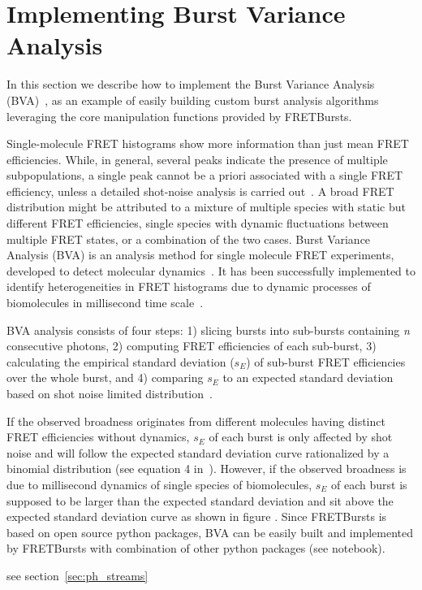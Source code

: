 \section{Implementing Burst Variance Analysis}
In this section we describe how to implement the Burst Variance Analysis (BVA)~\cite{Torella_2011},
as an example of easily building custom burst analysis algorithms leveraging the core manipulation 
functions provided by FRETBursts.

Single-molecule FRET histograms show more information than just mean FRET efficiencies. 
While, in general, several peaks indicate the presence of multiple subpopulations, 
a single peak cannot be a priori associated with a single FRET efficiency,
unless a detailed shot-noise analysis is carried out~\cite{Nir_2006}.
A broad FRET distribution might be attributed to a mixture of multiple species with static but different FRET efficiencies, single species with dynamic fluctuations between multiple FRET states, or a combination of the two cases. Burst Variance Analysis (BVA) is an analysis method for single molecule FRET experiments, developed to detect molecular dynamics~\cite{Torella_2011}. It has been successfully implemented to identify heterogeneities in FRET histograms due to dynamic processes of biomolecules in millisecond time scale~\cite{Torella_2011, Robb_2013}.

BVA analysis consists of four steps: 1) slicing bursts into sub-bursts containing \textit{n} consecutive photons, 2) computing FRET efficiencies of each sub-burst, 3) calculating the empirical standard deviation ($s_E$) of sub-burst FRET efficiencies over the whole burst, and 4) comparing $s_E$ to an expected standard deviation based on shot noise limited distribution~\cite{Torella_2011}. 

If the observed broadness originates from different molecules having distinct FRET efficiencies without dynamics, $s_E$ of each burst is only affected by shot noise and will follow the expected standard deviation curve rationalized by a binomial distribution (see equation 4 in~\cite{Torella_2011}). However, if the observed broadness is due to millisecond dynamics of single species of biomolecules, $s_E$ of each burst is supposed to be larger than the expected standard deviation and sit above the expected standard deviation curve as shown in figure .
Since FRETBursts is based on open source python packages, BVA can be easily built and implemented by FRETBursts with combination of other python packages (see notebook).  



see section~\ref{sec:ph_streams}